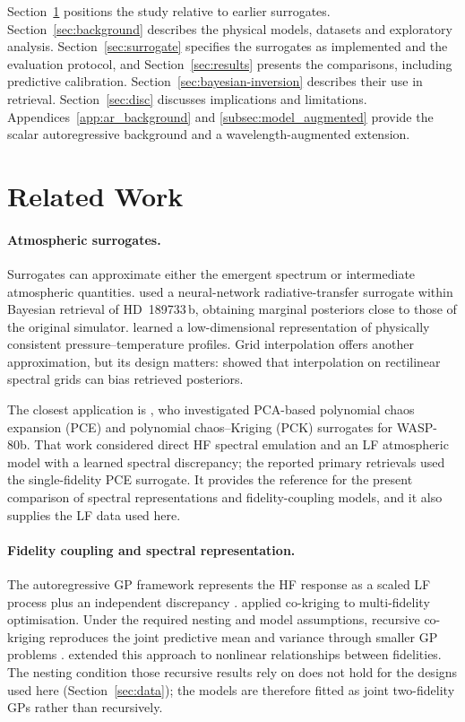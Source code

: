 \documentclass[12pt, letterpaper, oneside]{article}
\begin{document}
Section~\ref{sec:related work} positions the study relative to earlier
surrogates. Section~\ref{sec:background} describes the physical models,
datasets and exploratory analysis. Section~\ref{sec:surrogate} specifies
the surrogates as implemented and the evaluation protocol, and
Section~\ref{sec:results} presents the comparisons, including predictive
calibration. Section~\ref{sec:bayesian-inversion} describes their use in
retrieval. Section~\ref{sec:disc} discusses implications and limitations.
Appendices~\ref{app:ar_background} and \ref{subsec:model_augmented} provide
the scalar autoregressive background and a wavelength-augmented extension.

\section{Related Work}
\label{sec:related work}

\paragraph{Atmospheric surrogates.}
\label{sec:lit-surrogates}
Surrogates can approximate either the emergent spectrum or intermediate
atmospheric quantities. \citet{Himes2022} used a neural-network
radiative-transfer surrogate within Bayesian retrieval of HD~189733\,b,
obtaining marginal posteriors close to those of the original simulator.
\citet{Gebhard2024} learned a low-dimensional representation of physically
consistent pressure--temperature profiles. Grid interpolation offers another
approximation, but its design matters: \citet{FisherHeng2022} showed that
interpolation on rectilinear spectral grids can bias retrieved posteriors.

The closest application is \citet{Nussbaumer2026}, who investigated
PCA-based polynomial chaos expansion (PCE) and polynomial chaos--Kriging
(PCK) surrogates for WASP-80b. That work considered direct HF spectral
emulation and an LF atmospheric model with a learned spectral discrepancy;
the reported primary retrievals used the single-fidelity PCE surrogate.
It provides the reference for the present comparison of spectral
representations and fidelity-coupling models, and it also supplies the LF
data used here.

\paragraph{Fidelity coupling and spectral representation.}
\label{sec:lit-mf}
The autoregressive GP framework represents the HF response as a scaled LF
process plus an independent discrepancy \citep{KennedyOHagan2000}.
\citet{Forrester2007} applied co-kriging to multi-fidelity optimisation.
Under the required nesting and model assumptions, recursive co-kriging
reproduces the joint predictive mean and variance through smaller GP
problems \citep{LeGratiet2014,LeGratietGarnier2014}.
\citet{Perdikaris2017} extended this approach to nonlinear relationships
between fidelities. The nesting condition those recursive results rely on
does not hold for the designs used here (Section~\ref{sec:data}); the
models are therefore fitted as joint two-fidelity GPs rather than
recursively.
\end{document}
